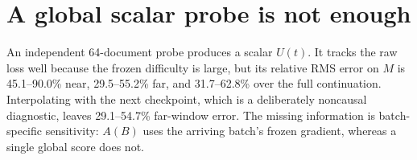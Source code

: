 \section{A global scalar probe is not enough}

An independent 64-document probe produces a scalar \(U(t)\).  It tracks the raw loss well because the frozen difficulty is large, but its relative RMS error on \(M\) is 45.1--90.0\% near, 29.5--55.2\% far, and 31.7--62.8\% over the full continuation.  Interpolating with the next checkpoint, which is a deliberately noncausal diagnostic, leaves 29.1--54.7\% far-window error.  The missing information is batch-specific sensitivity: \(A(B)\) uses the arriving batch's frozen gradient, whereas a single global score does not.
